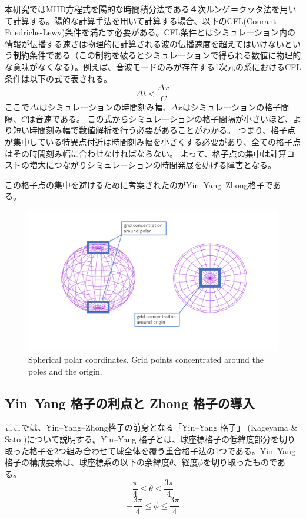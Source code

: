 \documentclass[12pt]{jsarticle}
\begin{document}
本研究ではMHD方程式を陽的な時間積分法である４次ルンゲ＝クッタ法を用いて計算する。陽的な計算手法を用いて計算する場合、以下のCFL(Courant-Friedrichs-Lewy)条件を満たす必要がある。CFL条件とはシミュレーション内の情報が伝播する速さは物理的に計算される波の伝播速度を超えてはいけないという制約条件である（この制約を破るとシミュレーションで得られる数値に物理的な意味がなくなる）。例えば、音波モードのみが存在する1次元の系におけるCFL条件は以下の式で表される。
\begin{equation}
\Delta t < \frac{\Delta x}{C} 
\end{equation}
ここで$\Delta t$はシミュレーションの時間刻み幅、$\Delta x$はシミュレーションの格子間隔、$C$は音速である。
この式からシミュレーションの格子間隔が小さいほど、より短い時間刻み幅で数値解析を行う必要があることがわかる。
つまり、格子点が集中している特異点付近は時間刻み幅を小さくする必要があり、全ての格子点はその時間刻み幅に合わせなければならない。
よって、格子点の集中は計算コストの増大につながりシミュレーションの時間発展を妨げる障害となる。

この格子点の集中を避けるために考案されたのがYin--Yang--Zhong格子である。~\cite{hayashi2016yin}

\begin{figure}[H]
\centering
\includegraphics[height=0.5\textheight,width=1.0\hsize,angle=0,keepaspectratio]{./Image/grid.png}
\caption{Spherical polar coordinates. Grid points concentrated around the poles and the origin.} \label{fig:grid}
\end{figure}



\subsection{Yin--Yang 格子の利点と Zhong 格子の導入}
ここでは、Yin--Yang--Zhong格子の前身となる「Yin--Yang 格子」 (Kageyama \& Sato \cite{kageyama2004yin})について説明する。Yin--Yang 格子とは、球座標格子の低緯度部分を切り取った格子を2つ組み合わせて球全体を覆う重合格子法の1つである。Yin--Yang 格子の構成要素は、球座標系の以下の余緯度$\theta$、経度$\phi$を切り取ったものである。
\begin{equation}
\frac{\pi}{4} \leq \theta \leq \frac{3\pi}{4}
\end{equation}
\begin{equation}
-\frac{3\pi}{4} \leq \phi \leq \frac{3\pi}{4}
\end{equation}
\end{document}
